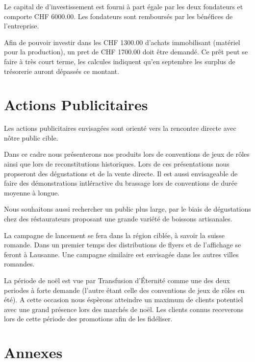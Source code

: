 \documentclass[10pt,a4paper]{article}
\newcommand{\tde}{Transfusion d'Éternité}
\begin{document}
Le capital de d'investissement est fourni à part égale par les deux fondateurs et comporte CHF 6000.00.
Les fondateurs sont remboursés par les bénéfices de l'entreprise.

Afin de pouvoir investir dans les CHF 1300.00 d'achats immobilisant (matériel pour la production), un pret de CHF 1700.00 doit être demandé.
Ce prêt peut se faire à très court terme, les calcules indiquent qu'en septembre les surplus de trésorerie auront dépassés ce montant.


\section{Actions Publicitaires}
Les actions publicitaires envisagées sont orienté vers la rencontre directe avec nôtre public cible.

Dans ce cadre nous présenterons nos produits lors de conventions de jeux de rôles ainsi que lors de reconstitutions historiques.
Lors de ces présentations nous propseront des dégustations et de la vente directe.
Il est aussi envisageable de faire des démonstrations intléractive du brassage lors de conventions de durée moyenne à longue.

Nous souhaitons aussi rechercher un public plus large, par le biais de dégustations chez des réstaurateurs proposant une grande variété de boissons artisanales.

La campagne de lancement se fera dans la région ciblée, à savoir la suisse romande.
Dans un premier temps des distributions de flyers et de l'affichage se feront à Lausanne.
Une campagne similaire est envisagée dans les autres villes romandes.

La période de noël est vue par \tde{} comme une des deux periodes à forte demande (l'autre étant celle des conventions de jeux de rôles en été).
A cette occasion nous éspèrons atteindre un maximum de clients potentiel avec une grand présence lors des marchés de noël.
Les clients connus receverons lors de cette période des promotions afin de les fidéliser.
\section{Annexes}
\end{document}
